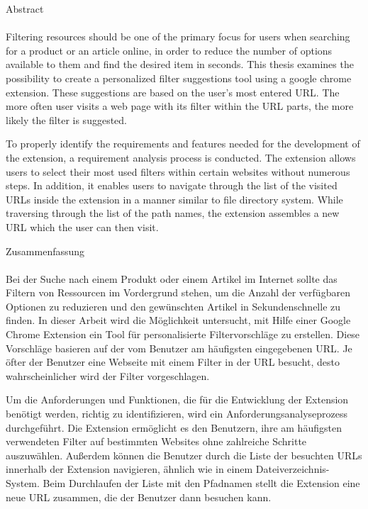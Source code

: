 \newpage
\thispagestyle{empty}
\vspace*{2.2cm}
\noindent %
{\Huge Abstract}\\
\vspace*{1.6cm} \\

\pagestyle{headings}
Filtering resources should be one of the primary focus for users when searching for a product or an article online, in order to reduce the number of options available to them and find the desired item in seconds. This thesis examines the possibility to create a personalized filter suggestions tool using a google chrome extension. These suggestions are based on the user's most entered URL. The more often user visits a web page with its filter within the URL parts, the more likely the filter is suggested.

To properly identify the requirements and features needed for the development of the extension, a requirement analysis process is conducted. The extension allows users to select their most used filters within certain websites without numerous steps. In addition, it enables users to navigate through the list of the visited URLs inside the extension in a manner similar to file directory system. While traversing through the list of the path names, the extension assembles a new URL which the user can then visit.

\newpage
\thispagestyle{empty}
\vspace*{2.2cm}
\noindent %
{\Huge Zusammenfassung}\\
\vspace*{1.6cm} \\

\pagestyle{headings}
Bei der Suche nach einem Produkt oder einem Artikel im Internet sollte das Filtern von Ressourcen im Vordergrund stehen, um die Anzahl der verf\"ugbaren Optionen zu reduzieren und den gew\"unschten Artikel in Sekundenschnelle zu finden. In dieser Arbeit wird die M\"oglichkeit untersucht, mit Hilfe einer Google Chrome Extension ein Tool f\"ur personalisierte Filtervorschl\"age zu erstellen. Diese Vorschl\"age basieren auf der vom Benutzer am h\"aufigsten eingegebenen URL. Je \"ofter der Benutzer eine Webseite mit einem Filter in der URL besucht, desto wahrscheinlicher wird der Filter vorgeschlagen.

Um die Anforderungen und Funktionen, die f\"ur die Entwicklung der Extension ben\"otigt werden, richtig zu identifizieren, wird ein Anforderungsanalyseprozess durchgef\"uhrt. Die Extension erm\"oglicht es den Benutzern, ihre am h\"aufigsten verwendeten Filter auf bestimmten Websites ohne zahlreiche Schritte auszuw\"ahlen. Au{\ss}erdem k\"onnen die Benutzer durch die Liste der besuchten URLs innerhalb der Extension navigieren, \"ahnlich wie in einem Dateiverzeichnis-System. Beim Durchlaufen der Liste mit den Pfadnamen stellt die Extension eine neue URL zusammen, die der Benutzer dann besuchen kann.

